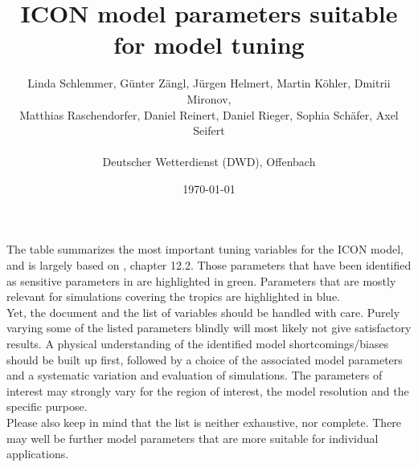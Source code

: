 \documentclass[11pt]{article}
\title{ICON model parameters suitable for model tuning}
\author{Linda Schlemmer, G\"unter Z\"angl, J\"urgen Helmert, Martin K\"ohler, Dmitrii Mironov,\\
   Matthias Raschendorfer, Daniel Reinert, Daniel Rieger, Sophia Sch\"afer, Axel Seifert \\ \\ Deutscher Wetterdienst (DWD), Offenbach}
\date{\today}
\begin{document}
\maketitle

The table summarizes the most important tuning variables for the ICON model, and is largely based on \citet{ICON_database}, chapter 12.2. Those parameters that have been identified as sensitive parameters in \citet{cosmo_42} are highlighted in green. Parameters that are mostly relevant for simulations covering the tropics are highlighted in blue.\\

Yet, the document and the list of variables should be handled with care. Purely varying some of the listed parameters blindly will most likely not give satisfactory results. A physical understanding of the identified model shortcomings/biases should be built up first, followed by a choice of the associated model parameters and a systematic variation and evaluation of simulations. The parameters of interest may strongly vary for the region of interest, the model resolution and the specific purpose.\\

Please also keep in mind that the list is neither exhaustive, nor complete. There may well be further model parameters that are more suitable for individual applications.

\end{document}
